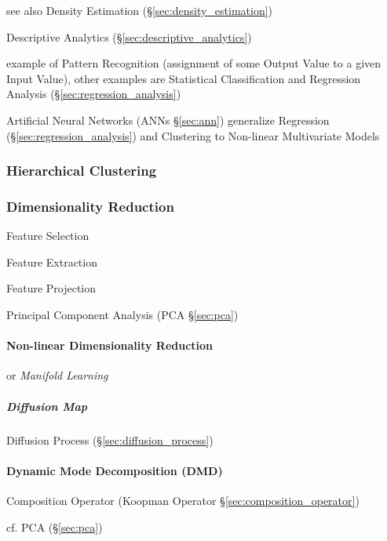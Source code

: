 see also Density Estimation (\S\ref{sec:density_estimation})

\fist Descriptive Analytics (\S\ref{sec:descriptive_analytics})

example of Pattern Recognition (assignment of some Output Value to a given Input
Value), other examples are Statistical Classification and Regression Analysis
(\S\ref{sec:regression_analysis})

Artificial Neural Networks (ANNs \S\ref{sec:ann}) generalize Regression
(\S\ref{sec:regression_analysis}) and Clustering to Non-linear Multivariate
Models



\subsubsection{Hierarchical Clustering}\label{sec:hierarchical_clustering}

\subsubsection{Dimensionality Reduction}\label{sec:dimensionality_reduction}

Feature Selection

Feature Extraction

Feature Projection

Principal Component Analysis (PCA \S\ref{sec:pca})



\paragraph{Non-linear Dimensionality Reduction}
\label{sec:nonlinear_dimensionality}\hfill

or \emph{Manifold Learning}



\subparagraph{Diffusion Map}\label{sec:diffusion_map}\hfill

Diffusion Process (\S\ref{sec:diffusion_process})



\paragraph{Dynamic Mode Decomposition (DMD)}\label{sec:dmd}\hfill

Composition Operator (Koopman Operator \S\ref{sec:composition_operator})

cf. PCA (\S\ref{sec:pca})


